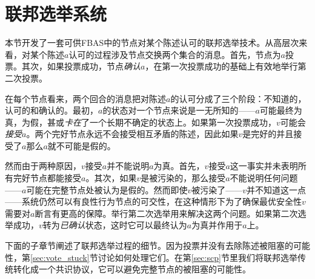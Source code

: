 \section{联邦选举系统}\label{sec:voting}

本节开发了一套可供FBAS中的节点对某个陈述认可的联邦选举技术。从高层次来看，对某个陈述$a$认可的过程涉及节点交换两个集合的消息。首先，节点为$a$投票。其次，如果投票成功，节点\textit{确认}$a$，在第一次投票成功的基础上有效地举行第二次投票。

在每个节点看来，两个回合的消息把对陈述$a$的认可分成了三个阶段：不知道的，认可的和确认的。最初，$a$的状态对一个节点来说是一无所知的——$a$可能最终为真，为假，甚或\textit{卡在}了一个长期不确定的状态上。如果第一次投票成功，$v$可能会\textit{接受}$a$。两个完好节点永远不会接受相互矛盾的陈述，因此如果$v$是完好的并且接受了$a$那么$a$就不可能是假的。

然而由于两种原因，$v$接受$a$并不能说明$a$为真。首先，$v$接受$a$这一事实并未表明所有完好节点都能接受$a$。其次，如果$v$是被污染的，那么接受$a$不能说明任何问题——$a$可能在完整节点处被认为是假的。然而即使$v$被污染了——$v$并不知道这一点——系统仍然可以有良性行为节点的{\quorum}可交性，在这种情形下为了确保最优安全性$v$需要对$a$断言有更高的保障。举行第二次选举用来解决这两个问题。如果第二次选举成功，$v$转为\textit{已确认}状态，这时它可以最终认为$a$为真并作用于$a$上。

下面的子章节阐述了联邦选举过程的细节。因为投票并没有去除陈述被阻塞的可能性，第\ref{sec:vote_stuck}节讨论如何处理它们。在第\ref{sec:scp}节里我们将联邦选举传统转化成一个共识协议，它可以避免完整节点的被阻塞{\slot}的可能性。






